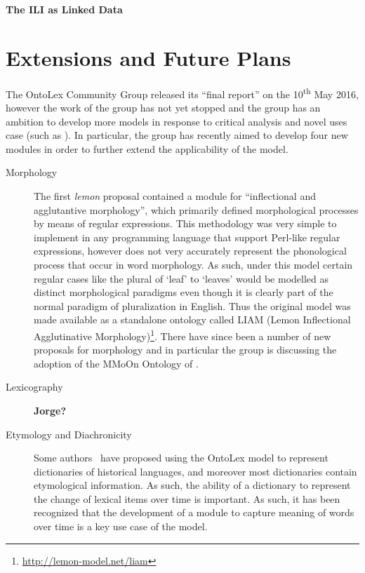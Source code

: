 \documentclass[12pt,a4paper]{elex2017}
\begin{document}
\textbf{The ILI as Linked Data}

\section{Extensions and Future Plans}

The OntoLex Community Group released its ``final report'' on the
10\textsuperscript{th} May 2016,
however the work of the group has not yet stopped and the group has an ambition
to develop more models in response to critical analysis and novel uses case
(such as \cite{chavula2014lemon}). In particular, the group has recently aimed
to develop four new modules in order to further extend the applicability of the
model.

\begin{description}
    \item[Morphology] The first \emph{lemon} proposal contained a module for
        ``inflectional and agglutantive morphology'', which primarily defined
        morphological processes by means of regular expressions. This
        methodology was very simple to implement in any programming language
        that support Perl-like regular expressions, however does not very
        accurately represent the phonological process that occur in word
        morphology. As such, under this model certain regular cases like the
        plural of `leaf' to `leaves' would be modelled as distinct morphological
        paradigms even though it is clearly part of the normal paradigm of
        pluralization in English. Thus the original model was made available as
        a standalone ontology called LIAM (Lemon Inflectional Agglutinative
        Morphology)\footnote{\url{http://lemon-model.net/liam}}. There have
        since been a number of new proposals for morphology and in particular
        the group is discussing the adoption of the MMoOn Ontology of
        \cite{MMoOn_heb}.
    \item[Lexicography] \textbf{Jorge?}
    \item[Etymology and Diachronicity] Some authors~\citep{khan2014using,abromeit2016linking} have
        proposed using the OntoLex model to represent dictionaries of historical
        languages, and moreover most dictionaries contain etymological
        information. As such, the ability of a dictionary to represent the
        change of lexical items over time is important. As such, it has been
        recognized that the development of a module to capture meaning of words
        over time is a key use case of the model.

\end{description}
\end{document}
